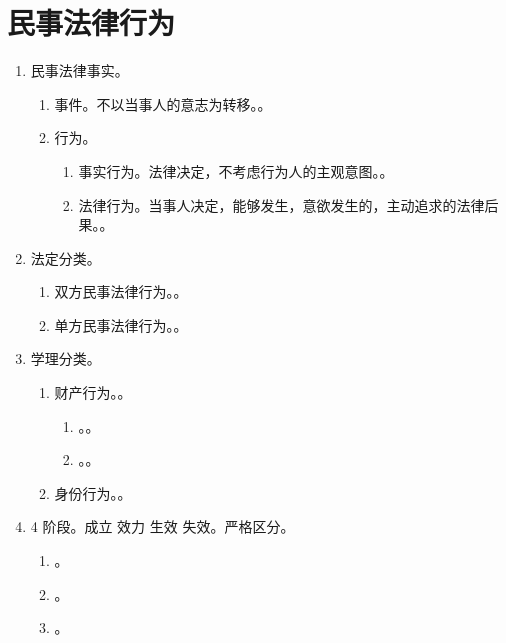 \section{民事法律行为}
\begin{enumerate}
  \item 民事法律事实。
        \begin{enumerate}
          \item 事件。不以当事人的意志为转移。。
          \item 行为。
                \begin{enumerate}
                  \item 事实行为。法律决定，不考虑行为人的主观意图。。
                  \item 法律行为。当事人决定，能够发生，意欲发生的，主动追求的法律后果。。
                \end{enumerate}
        \end{enumerate}
  \item 法定分类。
        \begin{enumerate}
          \item 双方民事法律行为。。
          \item 单方民事法律行为。。
        \end{enumerate}
  \item 学理分类。
        \begin{enumerate}
          \item 财产行为。。
                \begin{enumerate}
                  \item {}。。
                  \item {}。。
                \end{enumerate}
          \item 身份行为。。
        \end{enumerate}
  \item 4 阶段。成立 \yjt 效力 \yjt 生效 \yjt 失效。严格区分。
        \begin{enumerate}
          \item {}。
          \item {}。
          \item {}。

\end{enumerate}
\end{enumerate}
